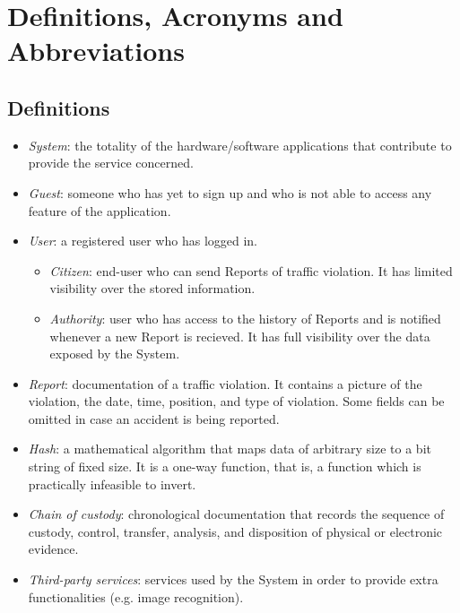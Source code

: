 \documentclass{report}
\begin{document}
\section{Definitions, Acronyms and Abbreviations}
\subsection{Definitions}
\begin{itemize}
	\item \textit{System}: the totality of the hardware/software applications that contribute to provide the service concerned.
    \item \textit{Guest}: someone who has yet to sign up and who is not able to access any feature of the application.
    \item \textit{User}: a registered user who has logged in.
	\begin{itemize}
		\item \textit{Citizen}: end-user who can send Reports of traffic violation. It has limited visibility over the stored information.
		\item \textit{Authority}: user who has access to the history of Reports and is notified whenever a new Report is recieved. It has full visibility over the data exposed by the System.
	\end{itemize} 
    \item \textit{Report}: documentation of a traffic violation. It contains a picture of the violation, the date, time, position, and type of violation. Some fields can be omitted in case an accident is being reported.
    \item \textit{Hash}: a mathematical algorithm that maps data of arbitrary size to a bit string of fixed size. It is a one-way function, that is, a function which is practically infeasible to invert.
    \item \textit{Chain of custody}: chronological documentation that records the sequence of custody, control, transfer, analysis, and disposition of physical or electronic evidence.
    \item \textit{Third-party services}: services used by the System in order to provide extra functionalities (e.g. image recognition).
\end{itemize}
\end{document}
